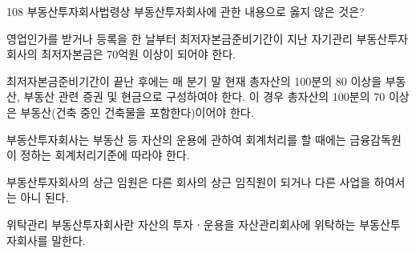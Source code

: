 \begin{question}{108}
부동산투자회사법령상 부동산투자회사에 관한 내용으로 옳지 않은 것은?
\begin{choices}
  \item 영업인가를 받거나 등록을 한 날부터 최저자본금준비기간이 지난 자기관리 부동산투자회사의 최저자본금은 70억원 이상이 되어야 한다.
  \item 최저자본금준비기간이 끝난 후에는 매 분기 말 현재 총자산의 100분의 80 이상을 부동산, 부동산 관련 증권 및 현금으로 구성하여야 한다. 이 경우 총자산의 100분의 70 이상은 부동산(건축 중인 건축물을 포함한다)이어야 한다.
  \item 부동산투자회사는 부동산 등 자산의 운용에 관하여 회계처리를 할 때에는 금융감독원이 정하는 회계처리기준에 따라야 한다.
  \item 부동산투자회사의 상근 임원은 다른 회사의 상근 임직원이 되거나 다른 사업을 하여서는 아니 된다.
  \item 위탁관리 부동산투자회사란 자산의 투자ㆍ운용을 자산관리회사에 위탁하는 부동산투자회사를 말한다.
\end{choices}
\end{question}
